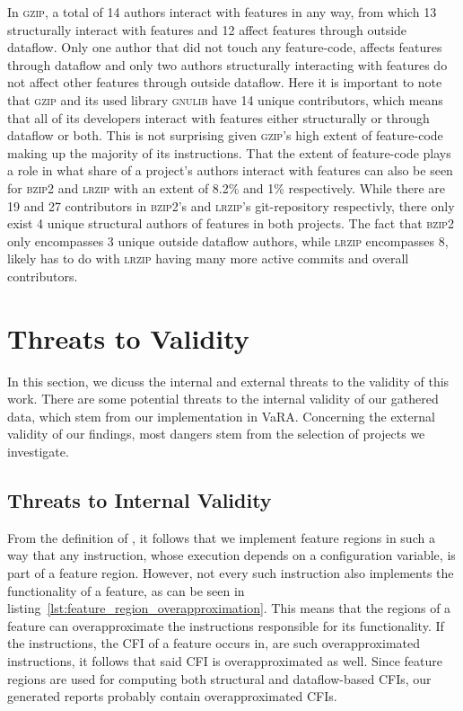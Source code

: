 In \textsc{gzip}, a total of 14 authors interact with features in any way, from which 13 structurally interact with features and 12 affect features through outside dataflow.
Only one author that did not touch any feature-code, affects features through dataflow and only two authors structurally interacting with features do not affect other features through outside dataflow.
Here it is important to note that \textsc{gzip} and its used library \textsc{gnulib} have 14 unique contributors, which means that all of its developers interact with features either structurally or through dataflow or both.
This is not surprising given \textsc{gzip}'s high extent of feature-code making up the majority of its instructions.
That the extent of feature-code plays a role in what share of a project's authors interact with features can also be seen for \textsc{bzip2} and \textsc{lrzip} with an extent of 8.2\% and 1\% respectively.
While there are 19 and 27 contributors in \textsc{bzip2}'s and \textsc{lrzip}'s git-repository respectivly, there only exist 4 unique structural authors of features in both projects.
The fact that \textsc{bzip2} only encompasses 3 unique outside dataflow authors, while \textsc{lrzip} encompasses 8, likely has to do with \textsc{lrzip} having many more active commits and overall contributors.

\section{Threats to Validity}\label{sec:threats}

In this section, we dicuss the internal and external threats to the validity of this work.
There are some potential threats to the internal validity of our gathered data, which stem from our implementation in VaRA. 
Concerning the external validity of our findings, most dangers stem from the selection of projects we investigate.

\subsection*{\textbf{Threats to Internal Validity}}

From the definition of , it follows that we implement feature regions in such a way that any instruction, whose execution depends on a configuration variable, is part of a feature region.
However, not every such instruction also implements the functionality of a feature, as can be seen in listing~\ref{lst:feature_region_overapproximation}.
This means that the regions of a feature can overapproximate the instructions responsible for its functionality.
If the instructions, the CFI of a feature occurs in, are such overapproximated instructions, it follows that said CFI is overapproximated as well.
Since feature regions are used for computing both structural and dataflow-based CFIs, our generated reports probably contain overapproximated CFIs.

